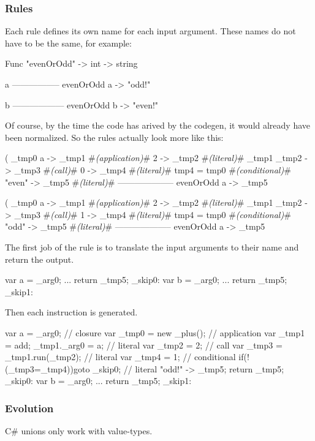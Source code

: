 \subsubsection{Rules}

Each rule defines its own name for each input argument.
These names do not have to be the same, for example:

\begin{code}
    Func "evenOrOdd" -> int -> string
    
    a%
    -----------------
    evenOrOdd a -> "odd!"

    b%
    ------------------
    evenOrOdd b -> "even!"
\end{code}

Of course, by the time the code has arived by the codegen, it would already have been normalized.
So the rules actually look more like this:

\begin{code}
    (%
    _tmp0 a -> _tmp1     #\textit{(application)}#
    2 -> _tmp2           #\textit{(literal)}#
    _tmp1 _tmp2 -> _tmp3 #\textit{(call)}#
    0 -> _tmp4           #\textit{(literal)}#
    tmp4 = tmp0          #\textit{(conditional)}#
    "even" -> _tmp5      #\textit{(literal)}#
    --------------------
    evenOrOdd a -> _tmp5
\end{code}

\begin{code}
    (%
    _tmp0 a -> _tmp1     #\textit{(application)}#
    2 -> _tmp2           #\textit{(literal)}#
    _tmp1 _tmp2 -> _tmp3 #\textit{(call)}#
    1 -> _tmp4           #\textit{(literal)}#
    tmp4 = tmp0          #\textit{(conditional)}#
    "odd" -> _tmp5       #\textit{(literal)}#
    --------------------
    evenOrOdd a -> _tmp5
\end{code}

The first job of the rule is to translate the input arguments to their name and return the output.

\begin{code}
    {
        var a = _arg0; 
        ...
        return _tmp5;
    }
    _skip0:
    {
        var b = _arg0;
        ...
        return _tmp5;
    }
    _skip1:
\end{code}

Then each instruction is generated.

\begin{code}
    {
        var a = _arg0; 
        // closure
        var _tmp0 = new _plus(); 
        // application
        var _tmp1 = add;
        _tmp1._arg0 = a;
        // literal
        var _tmp2 = 2;
        // call
        var _tmp3 = _tmp1.run(_tmp2);
        // literal     
        var _tmp4 = 1;
        // conditional
        if(!(_tmp3=_tmp4)){goto _skip0;}
        // literal
        "odd!" -> _tmp5;
        return _tmp5;
    }
    _skip0:
    {
        var b = _arg0;
        ...
        return _tmp5;
    }
    _skip1:
\end{code}


\subsubsection{Evolution}
C\# unions only work with value-types.

